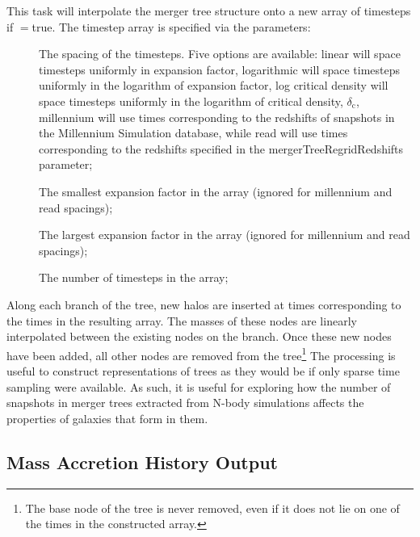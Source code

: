 This task will interpolate the merger tree structure onto a new array of timesteps if {\normalfont \ttfamily [mergerTreeRegridTimes]}$=${\normalfont \ttfamily true}. The timestep array is specified via the parameters:
\begin{description}
\item[{\normalfont \ttfamily [mergerTreeRegridSpacing]}] The spacing of the timesteps. Five options are available: {\normalfont \ttfamily linear} will space timesteps uniformly in expansion factor, {\normalfont \ttfamily logarithmic} will space timesteps uniformly in the logarithm of expansion factor, {\normalfont \ttfamily log critical density} will space timesteps uniformly in the logarithm of critical density, $\delta_{\mathrm c}$, {\normalfont \ttfamily millennium} will use times corresponding to the redshifts of snapshots in the Millennium Simulation database, while {\normalfont \ttfamily read} will use times corresponding to the redshifts specified in the {\normalfont \ttfamily mergerTreeRegridRedshifts} parameter;
\item[{\normalfont \ttfamily [mergerTreeRegridStartExpansionFactor]}] The smallest expansion factor in the array (ignored for {\normalfont \ttfamily millennium} and {\normalfont \ttfamily read} spacings);
\item[{\normalfont \ttfamily [mergerTreeRegridEndExpansionFactor]}] The largest expansion factor in the array (ignored for {\normalfont \ttfamily millennium} and {\normalfont \ttfamily read} spacings);
\item[{\normalfont \ttfamily [mergerTreeRegridCount]}] The number of timesteps in the array;
\end{description}
Along each branch of the tree, new halos are inserted at times corresponding to the times in the resulting array. The masses of these nodes are linearly interpolated between the existing nodes on the branch. Once these new nodes have been added, all other nodes are removed from the tree\footnote{The base node of the tree is never removed, even if it does not lie on one of the times in the constructed array.} The processing is useful to construct representations of trees as they would be if only sparse time sampling were available. As such, it is useful for exploring how the number of snapshots in merger trees extracted from N-body simulations affects the properties of galaxies that form in them.

\subsection{Mass Accretion History Output}

